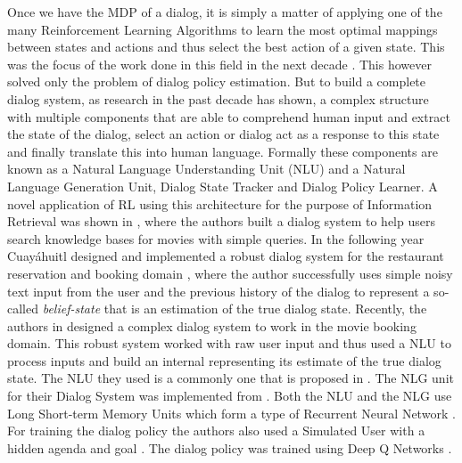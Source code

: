 \documentclass[14pt]{extarticle}
\numberwithin{equation}{section}
\begin{document}
	 Once we have the MDP of a dialog, it is simply a matter of applying one of the many Reinforcement Learning Algorithms to learn the most optimal mappings between states and actions and thus select the best action of a given state. This was the focus of the work done in this field in the next decade \cite{Young99probabilisticmethods}\cite{Singh_mdp}\cite{Pietquin_mdp}. This however solved only the problem of dialog policy estimation. But to build a complete dialog system, as research in the past decade has shown, a complex structure with multiple components that are able to comprehend human input and extract the state of the dialog, select an action or dialog act as a response to this state and finally translate this into human language. Formally these components are known as  a Natural Language Understanding Unit (NLU) and a Natural Language Generation Unit, Dialog State Tracker and Dialog Policy Learner. A novel application of RL using this architecture for the purpose of Information Retrieval was shown in \cite{Dhingra2016EndtoEndRL}, where the authors built a dialog system to help users search knowledge bases for movies with simple queries. In the following year Cuayáhuitl designed and implemented a robust dialog system for the restaurant reservation and booking domain \cite{Cuayhuitl2016SimpleDSAS}, where the author successfully uses simple noisy text input from the user and the previous history of the dialog to represent a so-called \textit{belief-state} that is an estimation of the true dialog state. Recently, the authors in \cite{Li17e2eDS} designed a complex dialog system to work in the movie booking domain. This robust system worked with raw user input and thus used a NLU to process inputs and build an internal  representing its estimate of the true dialog state. The NLU they used is a commonly one that is proposed in \cite{HakkaniTr2016NLU}. The NLG unit for their Dialog System was implemented from \cite{Wen_NLG}. Both the NLU and the NLG use Long Short-term Memory Units which form a type of Recurrent Neural Network \cite{hochreiter1997long}. For training the dialog policy the authors also used a Simulated User with a hidden agenda and goal \cite{Schatzmann_agenda_sim}\cite{Li_user_sim}. The dialog policy was trained using Deep Q Networks \cite{Mnih_DQN}.
\end{document}
